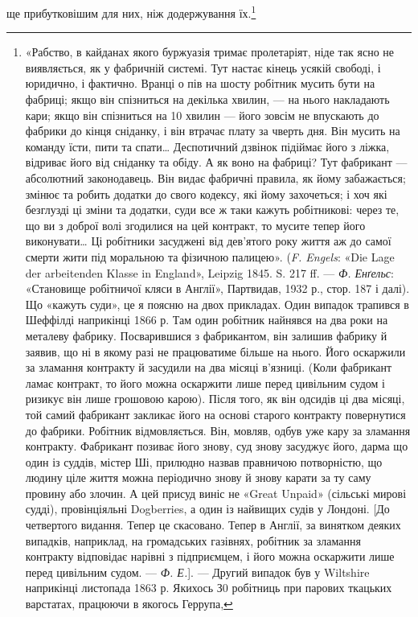 ще прибутковішим для них, ніж додержування їх.\footnote{
«Рабство, в кайданах якого буржуазія тримає пролетаріят, ніде
так ясно не виявляється, як у фабричній системі. Тут настає кінець
усякій свободі, і юридично, і фактично. Вранці о пів на шосту робітник
мусить бути на фабриці; якщо він спізниться на декілька хвилин, — на
нього накладають кари; якщо він спізниться на 10 хвилин — його зовсім
не впускають до фабрики до кінця сніданку, і він втрачає плату за
чверть дня. Він мусить на команду їсти, пити та спати\dots{} Деспотичний
дзвінок підіймає його з ліжка, відриває його від сніданку та обіду. А як
воно на фабриці? Тут фабрикант — абсолютний законодавець. Він видає
фабричні правила, як йому забажається; змінює та робить додатки
до свого кодексу, які йому захочеться; і хоч які безглузді ці зміни та
додатки, суди все ж таки кажуть робітникові: через те, що ви з доброї
волі згодилися на цей контракт, то мусите тепер його виконувати\dots{} Ці
робітники засуджені від дев’ятого року життя аж до самої смерти жити
під моральною та фізичною палицею». (\emph{F. Engels}: «Die Lage der
arbeitenden Klasse in England», Leipzig 1845. S. 217 ff. — \emph{Ф. Енґельс}:
«Становище робітничої кляси в Англії», Партвидав, 1932 р., стор. 187 і
далі). Що «кажуть суди», це я поясню на двох прикладах. Один випадок
трапився в Шеффілді наприкінці 1866 р. Там один робітник найнявся
на два роки на металеву фабрику. Посварившися з фабрикантом,
він залишив фабрику й заявив, що ні в якому разі не працюватиме
більше на нього. Його оскаржили за зламання контракту й засудили
на два місяці в’язниці. (Коли фабрикант ламає контракт, то його можна
оскаржити лише перед цивільним судом і ризикує він лише грошовою
карою). Після того, як він одсидів ці два місяці, той самий фабрикант
закликає його на основі старого контракту повернутися до фабрики.
Робітник відмовляється. Він, мовляв, одбув уже кару за зламання контракту.
Фабрикант позиває його знову, суд знову засуджує його, дарма
що один із суддів, містер Ші, прилюдно назвав правничою потворністю,
що людину ціле життя можна періодично знову й знову карати за ту саму
провину або злочин. А цей присуд виніс не «Great Unpaid» (сільські
мирові судді), провінціяльні Dogberries, а один із найвищих судів у
Лондоні. [До четвертого видання. Тепер це скасовано. Тепер в Англії,
за винятком деяких випадків, наприклад, на громадських газівнях, робітник
за зламання контракту відповідає нарівні з підприємцем, і його
можна оскаржити лише перед цивільним судом. — \emph{Ф. Е.}]. — Другий
випадок був у Wiltshire наприкінці листопада 1863 р. Якихось З0 робітниць
при парових ткацьких варстатах, працюючи в якогось Геррупа,
}
